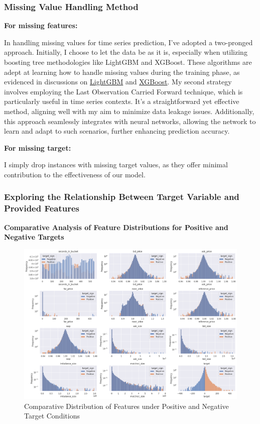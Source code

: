 \documentclass[12pt]{article}
\newtheorem{Proof of Lemma}{Proof of Lemma}
\begin{document}
\subsubsection*{Missing Value Handling Method}

\textbf{For missing features:}

In handling missing values for time series prediction, I've adopted a two-pronged approach. Initially, I choose to let the data be as it is, especially when utilizing boosting tree methodologies like LightGBM and XGBoost. These algorithms are adept at learning how to handle missing values during the training phase, as evidenced in discussions on \href{https://github.com/microsoft/LightGBM/issues/2921}{LightGBM} and \href{https://xgboost.readthedocs.io/en/stable/faq.html#how-to-deal-with-missing-values}{XGBoost}. My second strategy involves employing the Last Observation Carried Forward technique, which is particularly useful in time series contexts. It's a straightforward yet effective method, aligning well with my aim to minimize data leakage issues. Additionally, this approach seamlessly integrates with neural networks, allowing the network to learn and adapt to such scenarios, further enhancing prediction accuracy.

\textbf{For missing target:}

I simply drop instances with missing target values, as they offer minimal contribution to the effectiveness of our model.

\subsubsection*{Exploring the Relationship Between Target Variable and Provided Features}

\noindent \textbf{Comparative Analysis of Feature Distributions for Positive and Negative Targets}

\begin{figure}[H]
  \centering
  \includegraphics[width=1\linewidth]{images/Distribution.png}
  \caption{Comparative Distribution of Features under Positive and Negative Target Conditions}
  \label{fig:FeatureDistribution}
\end{figure}
\end{document}
